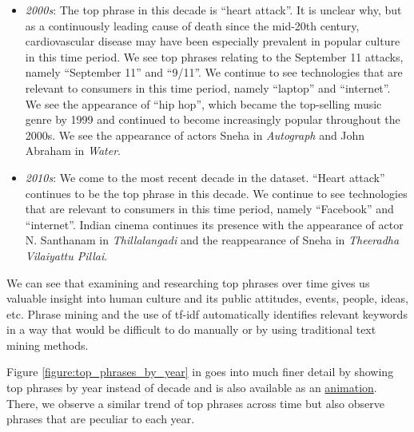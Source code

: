 \documentclass{article}
\begin{document}
\begin{multicols}{2}
\begin{itemize}
    \item \textit{2000s}: The top phrase in this decade is ``heart attack''. It is unclear why, but as a continuously leading cause of death since the mid-20th century, cardiovascular disease may have been especially prevalent in popular culture in this time period. We see top phrases relating to the September 11 attacks, namely ``September 11'' and ``9/11''. We continue to see technologies that are relevant to consumers in this time period, namely ``laptop'' and ``internet''. We see the appearance of ``hip hop'', which became the top-selling music genre by 1999 and continued to become increasingly popular throughout the 2000s. We see the appearance of actors Sneha in \textit{Autograph} and John Abraham in \textit{Water}.
    \item \textit{2010s}: We come to the most recent decade in the dataset. ``Heart attack'' continues to be the top phrase in this decade. We continue to see technologies that are relevant to consumers in this time period, namely ``Facebook'' and ``internet''. Indian cinema continues its presence with the appearance of actor N. Santhanam in \textit{Thillalangadi} and the reappearance of Sneha in \textit{Theeradha Vilaiyattu Pillai}.
\end{itemize}

We can see that examining and researching top phrases over time gives us valuable insight into human culture and its public attitudes, events, people, ideas, etc. Phrase mining and the use of tf-idf automatically identifies relevant keywords in a way that would be difficult to do manually or by using traditional text mining methods.

Figure \ref{figure:top_phrases_by_year} in  goes into much finer detail by showing top phrases by year instead of decade and is also available as an \href{https://www.youtube.com/watch?v=8aOob6iJO5Y}{animation}. There, we observe a similar trend of top phrases across time but also observe phrases that are peculiar to each year.


\end{multicols}
\end{document}
